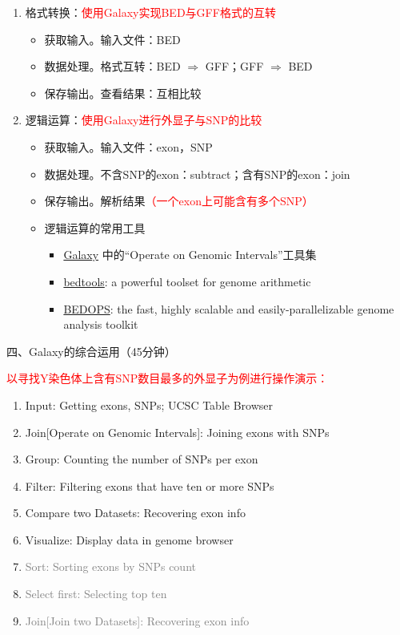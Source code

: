 \documentclass{TIJMUjiaoanLL}
\begin{document}
\begin{enumerate}
  \item 格式转换：\textcolor{red}{使用Galaxy实现BED与GFF格式的互转}
    \begin{itemize}
      \item 获取输入。输入文件：BED
      \item 数据处理。格式互转：BED $\Rightarrow$ GFF；GFF $\Rightarrow$ BED
      \item 保存输出。查看结果：互相比较
    \end{itemize}
  \item 逻辑运算：\textcolor{red}{使用Galaxy进行外显子与SNP的比较}
    \begin{itemize}
      \item 获取输入。输入文件：exon，SNP
      \item 数据处理。不含SNP的exon：subtract；含有SNP的exon：join
      \item 保存输出。解析结果\textcolor{red}{（一个exon上可能含有多个SNP）}
      \item 逻辑运算的常用工具
        \begin{itemize}
          \item \href{https://usegalaxy.org/}{Galaxy} 中的“Operate on Genomic Intervals”工具集
          \item \href{http://bedtools.readthedocs.org/en/latest/}{bedtools}: a powerful toolset for genome arithmetic
          \item \href{https://bedops.readthedocs.org/en/latest/}{BEDOPS}: the fast, highly scalable and easily-parallelizable genome analysis toolkit
        \end{itemize}
    \end{itemize}
\end{enumerate}

\vspace*{0.2cm}
\noindent
四、Galaxy的综合运用（45分钟）

\textcolor{red}{以寻找Y染色体上含有SNP数目最多的外显子为例进行操作演示：}
\begin{enumerate}
  \item Input: Getting exons, SNPs; UCSC Table Browser
  \item Join[Operate on Genomic Intervals]: Joining exons with SNPs
  \item Group: Counting the number of SNPs per exon
  \item Filter: Filtering exons that have ten or more SNPs
  \item Compare two Datasets: Recovering exon info 
  \item Visualize: Display data in genome browser
  \setcounter{enumi}{3}
\item \textcolor{gray}{Sort: Sorting exons by SNPs count}
  \setcounter{enumi}{3}
\item \textcolor{gray}{Select first: Selecting top ten}
  \setcounter{enumi}{4}
\item \textcolor{gray}{Join[Join two Datasets]: Recovering exon info}
\end{enumerate}
\end{document}
